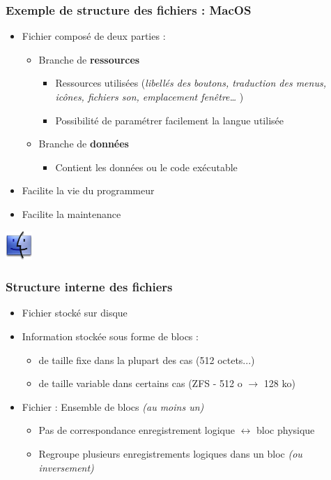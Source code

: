 \begin{frame}
\frametitle{Exemple de structure des fichiers : \textbf{MacOS}}
\begin{itemize}
\item Fichier composé de deux parties :
\begin{itemize}
\item Branche de \textbf{ressources}
\begin{itemize}
\item Ressources utilisées (\textit{libellés des boutons, traduction des menus, icônes, fichiers son, emplacement fenêtre… })
\item Possibilité de paramétrer facilement la langue utilisée
\end{itemize}
\item Branche de \textbf{données}
\begin{itemize}
\item Contient les données ou le code exécutable
\end{itemize}
\end{itemize}
\item Facilite la vie du programmeur
\item Facilite la maintenance 
\end{itemize}
\includegraphics[width=1cm]{../illustration/logo_macos.png}
\end{frame}

\begin{frame}
\frametitle{Structure interne des fichiers}
\begin{itemize}
\item Fichier stocké sur disque
\item Information stockée sous forme de blocs :
\begin{itemize}
\item de taille fixe dans la plupart des cas (512 octets...)
\item de taille variable dans certains cas (ZFS - 512 o $\rightarrow$ 128 ko)
\end{itemize}
\item Fichier : Ensemble de blocs \textit{(au moins un)}
\begin{itemize}
\item Pas de correspondance enregistrement logique $\leftrightarrow$ bloc physique
\item Regroupe plusieurs enregistrements logiques dans un bloc \textit{(ou inversement)}
\end{itemize}
\end{itemize}
\end{frame}

